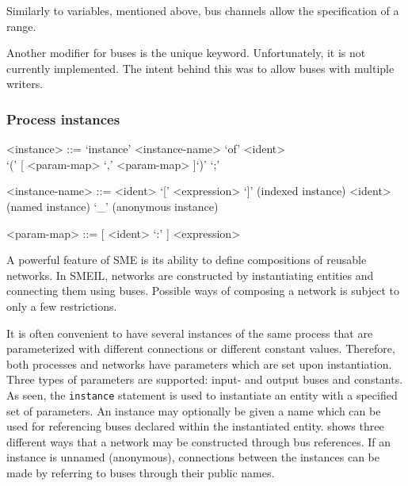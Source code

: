 Similarly to variables, mentioned above, bus channels allow the specification of
a {\ttfamily range}.

Another modifier for buses is the {\ttfamily unique} keyword. Unfortunately, it
is not currently implemented. The intent behind this was to allow buses with
multiple writers. 



\subsubsection{Process instances}
\begin{grammar}
  <instance> ::= `instance' <instance-name> `of' <ident> \\`(' [ <param-map> { `,' <param-map> } ]`)' `;'

  <instance-name> ::= <ident> `[' <expression> `]' (indexed instance)
  \alt <ident> (named instance)
  \alt `_' (anonymous instance)

  <param-map> ::= [ <ident> `:' ] <expression>

\end{grammar}

A powerful feature of SME is its ability to define compositions of reusable
networks. In SMEIL, networks are constructed by instantiating entities and
connecting them using buses. Possible ways of composing a network is subject to
only a few restrictions.

It is often convenient to have several instances of the same process that are
parameterized with different connections or different constant
values. Therefore, both processes and networks have parameters which are set
upon instantiation. Three types of parameters are supported: input- and output
buses and constants. As seen, the {\tt instance} statement is used to
instantiate an entity with a specified set of parameters. An instance may
optionally be given a name which can be used for referencing buses declared
within the instantiated entity.  shows three different ways that
a network may be constructed through bus references. If an instance is unnamed
(anonymous), connections between the instances can be made by referring to buses
through their public names.

